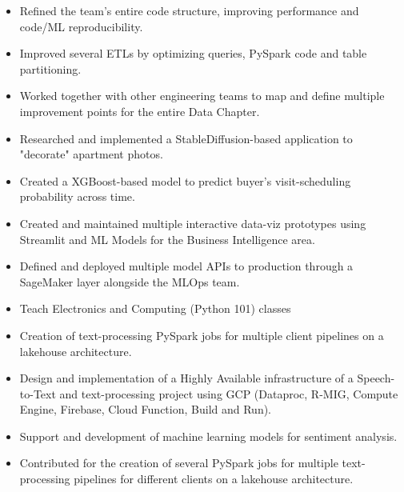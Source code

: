 \documentclass[10pt,a4paper,ragged2e,withhyper]{altacv}
\begin{document}
\begin{paracol}{2}
                \begin{itemize}
                    \item Refined the team's entire code structure, improving performance and code/ML reproducibility. 
                    \item Improved several ETLs by optimizing queries, PySpark code and table partitioning.
                    \item Worked together with other engineering teams to map and define multiple improvement points for the entire Data Chapter.
                    \item Researched and implemented a StableDiffusion-based application to "decorate" apartment photos.
                    \item Created a XGBoost-based model to predict buyer's visit-scheduling probability across time.
                    \item Created and maintained multiple interactive data-viz prototypes using Streamlit 
                            and ML Models for the Business Intelligence area.
                    \item Defined and deployed multiple model APIs to production through a SageMaker layer alongside the MLOps team.
                \end{itemize}
            \divider
                \begin{itemize}
                    \item Teach Electronics and Computing (Python 101) classes
                \end{itemize}
            \divider
                \begin{itemize}
                    \item Creation of text-processing PySpark jobs for multiple client pipelines on a lakehouse architecture.
                    \item Design and implementation of a Highly Available infrastructure of a Speech-to-Text and text-processing 
                    project using GCP (Dataproc, R-MIG, Compute Engine, Firebase, Cloud Function, Build and Run).
                    \item Support and development of machine learning models for sentiment analysis.
                    \item Contributed for the creation of several PySpark jobs for multiple text-processing pipelines for 
                    different clients on a lakehouse architecture.
                \end{itemize}
            \divider
            

\end{paracol}
\end{document}
